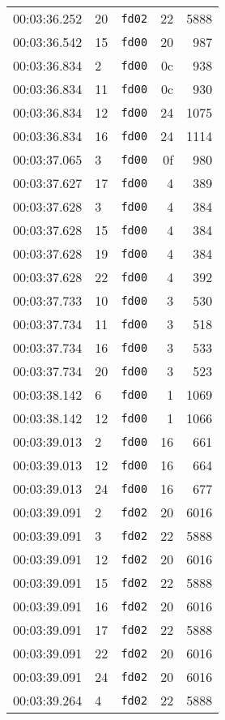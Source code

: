 \documentclass{article}
\begin{document}
\begin{longtable}{lllrr}
00:03:36.252 & 20 & \texttt{fd02} & 22 & 5888 \\
00:03:36.542 & 15 & \texttt{fd00} & 20 & 987 \\
00:03:36.834 & 2 & \texttt{fd00} & 0c & 938 \\
00:03:36.834 & 11 & \texttt{fd00} & 0c & 930 \\
00:03:36.834 & 12 & \texttt{fd00} & 24 & 1075 \\
00:03:36.834 & 16 & \texttt{fd00} & 24 & 1114 \\
00:03:37.065 & 3 & \texttt{fd00} & 0f & 980 \\
00:03:37.627 & 17 & \texttt{fd00} & 4 & 389 \\
00:03:37.628 & 3 & \texttt{fd00} & 4 & 384 \\
00:03:37.628 & 15 & \texttt{fd00} & 4 & 384 \\
00:03:37.628 & 19 & \texttt{fd00} & 4 & 384 \\
00:03:37.628 & 22 & \texttt{fd00} & 4 & 392 \\
00:03:37.733 & 10 & \texttt{fd00} & 3 & 530 \\
00:03:37.734 & 11 & \texttt{fd00} & 3 & 518 \\
00:03:37.734 & 16 & \texttt{fd00} & 3 & 533 \\
00:03:37.734 & 20 & \texttt{fd00} & 3 & 523 \\
00:03:38.142 & 6 & \texttt{fd00} & 1 & 1069 \\
00:03:38.142 & 12 & \texttt{fd00} & 1 & 1066 \\
00:03:39.013 & 2 & \texttt{fd00} & 16 & 661 \\
00:03:39.013 & 12 & \texttt{fd00} & 16 & 664 \\
00:03:39.013 & 24 & \texttt{fd00} & 16 & 677 \\
00:03:39.091 & 2 & \texttt{fd02} & 20 & 6016 \\
00:03:39.091 & 3 & \texttt{fd02} & 22 & 5888 \\
00:03:39.091 & 12 & \texttt{fd02} & 20 & 6016 \\
00:03:39.091 & 15 & \texttt{fd02} & 22 & 5888 \\
00:03:39.091 & 16 & \texttt{fd02} & 20 & 6016 \\
00:03:39.091 & 17 & \texttt{fd02} & 22 & 5888 \\
00:03:39.091 & 22 & \texttt{fd02} & 20 & 6016 \\
00:03:39.091 & 24 & \texttt{fd02} & 20 & 6016 \\
00:03:39.264 & 4 & \texttt{fd02} & 22 & 5888 \\

\end{longtable}
\end{document}

